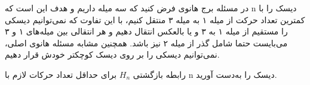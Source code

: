 \p
در مسئله برج هانوی فرض کنید که سه میله داریم و هدف این است که n دیسک را با کمترین تعداد حرکت از میله ۱ به میله ۳ منتقل کنیم، با این تفاوت که نمی‌توانیم دیسکی را مستقیم از میله ۱ به ۳ و یا بالعکس انتقال دهیم و هر انتقالی بین میله‌های ۱ و ۳ می‌بایست حتما شامل گذر از میله ۲ نیز باشد. همچنین مشابه مسئله هانوی اصلی، نمی‌توانیم دیسکی را بر روی دیسک کوچکتر خودش قرار دهیم.

رابطه بازگشتی 
$H_n$ برای حداقل تعداد حرکات لازم با n دیسک را به‌دست آورید.
